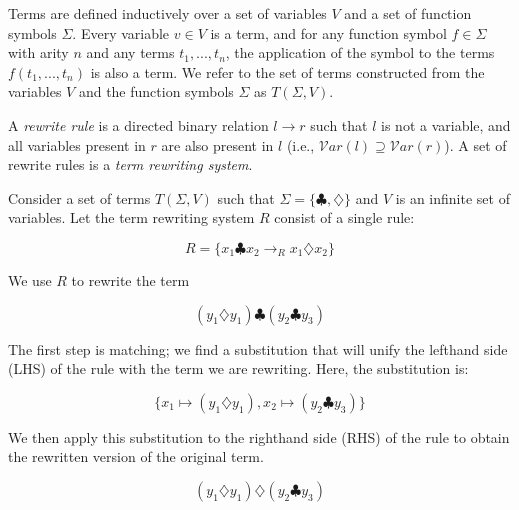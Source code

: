 \documentclass[sigplan,10pt,review,anonymous]{acmart}\settopmatter{printfolios=true,printccs=false,printacmref=false}
\begin{document}
Terms are defined inductively over a set of variables $V$ and a set of function symbols $\Sigma$. Every variable $v \in V$ is a term, and for any function symbol $f \in \Sigma$ with arity $n$ and any terms $t_1, ..., t_n$, the application of the symbol to the terms $f(t_1, ..., t_n)$ is also a term. We refer to the set of terms constructed from the variables $V$ and the function symbols $\Sigma$ as $T(\Sigma, V)$.

A \emph{rewrite rule} is a directed binary relation $l \rightarrow r$ such that $l$ is not a variable, and all variables present in $r$ are also present in $l$ (i.e., $\mathcal{V}ar(l) \supseteq \mathcal{V}ar(r)$). A set of rewrite rules is a \emph{term rewriting system}.

Consider a set of terms $T(\Sigma, V)$ such that $\Sigma = \{\clubsuit, \diamondsuit\}$ and $V$ is an infinite set of variables. Let the term rewriting system $R$ consist of a single rule:

\[ R = \{ x_1 \clubsuit x_2 \rightarrow_R x_1 \diamondsuit x_2 \} \]

We use $R$ to rewrite the term

\[ 
(y_1 \diamondsuit y_1) \clubsuit (y_2 \clubsuit y_3)
\]

The first step is matching; we find a substitution that will unify the lefthand side (LHS) of the rule with the term we are rewriting. Here, the substitution is:

\[
\{ x_1 \mapsto (y_1 \diamondsuit y_1), x_2 \mapsto (y_2 \clubsuit y_3) \}
\]

We then apply this substitution to the righthand side (RHS) of the rule to obtain the rewritten version of the original term.

\[ 
(y_1 \diamondsuit y_1) \diamondsuit (y_2 \clubsuit y_3)
\]
\end{document}
